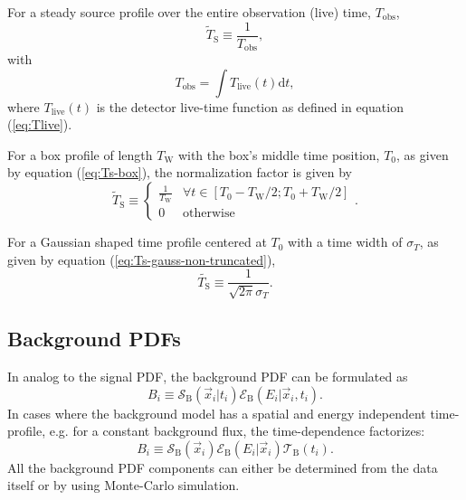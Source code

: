 \documentclass{article}
\begin{document}
For a steady source profile over the entire observation (live) time,
$T_{\mathrm{obs}}$,
\begin{equation}
 \tilde{T}_{\mathrm{S}} \equiv \frac{1}{T_{\mathrm{obs}}},
\end{equation}
with
\begin{equation}
 T_{\mathrm{obs}} = \int T_{\mathrm{live}}(t) \mathrm{d}t,
 \label{eq:Tobs}
\end{equation}
where $T_{\mathrm{live}}(t)$ is the detector live-time function as defined in
equation (\ref{eq:Tlive}).

For a box profile of length $T_{\mathrm{W}}$ with the box's middle time
position, $T_{0}$, as given by equation (\ref{eq:Ts-box}), the normalization
factor is given by
\begin{equation}
 \tilde{T}_{\mathrm{S}} \equiv
   \begin{cases}
     \frac{1}{T_{\mathrm{W}}} & \forall t \in \left[T_0 - T_{\mathrm{W}}/2; T_0 + T_{\mathrm{W}}/2 \right]\\
     0 & \mathrm{otherwise}
   \end{cases}.
\end{equation}

For a Gaussian shaped time profile centered at $T_0$ with a time width of $\sigma_T$,
as given by equation (\ref{eq:Ts-gauss-non-truncated}),
\begin{equation}
 \tilde{T_{\mathrm{S}}} \equiv \frac{1}{\sqrt{2\pi}\sigma_T}.
\end{equation}


\subsection{Background PDFs}

In analog to the signal PDF, the background PDF can be formulated as
\begin{equation}
 B_i \equiv \mathcal{S}_{\mathrm{B}}(\vec{x}_i|t_i) \mathcal{E}_{\mathrm{B}}(E_i|\vec{x}_i,t_i).
 \label{eq:Bit}
\end{equation}
In cases where the background model has a spatial and energy independent
time-profile, e.g. for a constant background flux, the time-dependence factorizes:
\begin{equation}
 B_i \equiv \mathcal{S}_{\mathrm{B}}(\vec{x}_i) \mathcal{E}_{\mathrm{B}}(E_i|\vec{x}_i) \mathcal{T}_{\mathrm{B}}(t_i).
 \label{eq:Bi}
\end{equation}
All the background PDF components can either be determined from the data itself
or by using Monte-Carlo simulation.
\end{document}
